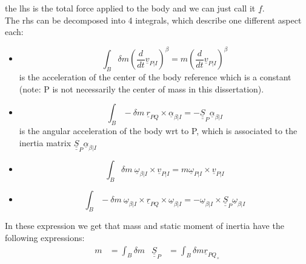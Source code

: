 the lhs is the total force applied to the body and we can just call it $\underline{f}$.
\\
The rhs can be decomposed into 4 integrals, which describe one different aspect each:
\begin{itemize}
    \item 
     \begin{equation}
    \int_B\delta m \left(\frac{d}{dt}\underline{v}_{P|I}\right)^\beta = m \left(\frac{d}{dt}\underline{v}_{P|I}\right)^\beta 
\end{equation}
is the acceleration of the center of the body reference which is a constant (note: P is not necessarily the center of mass in this dissertation).
\item 
\begin{equation}
    \int_B -\delta m ~\underline{r}_{PQ}\times \underline{\alpha}_{\beta|I} = -\underline{\underline{S}}_P \underline{\alpha}_{\beta|I}
\end{equation}
is the angular acceleration of the body wrt to P, which is associated to the inertia matrix $\underline{\underline{S}}_P \underline{\alpha}_{\beta|I}$
\item 
\begin{equation}
    \int_B \delta m ~\underline{\omega}_{\beta|I}\times \underline{v}_{P|I} = m \underline{\omega}_{P|I}\times \underline{v}_{P|I}
\end{equation}

\item 
\begin{equation}
    \int_B -\delta m ~\underline{\omega}_{\beta|I} \times \underline{r}_{PQ} \times \underline{\omega}_{\beta|I} = -\underline{\omega}_{\beta|I}\times \underline{\underline{S}}_P\underline{\omega}_{\beta|I}
\end{equation}

\end{itemize}
In these expression we get that mass and static moment of inertia have the following expressions:
\begin{align}
    m &= \int_B \delta m & \underline{\underline{S}}_P &= \int_B \delta m \underline{r}_{{PQ}_\times}
\end{align}

